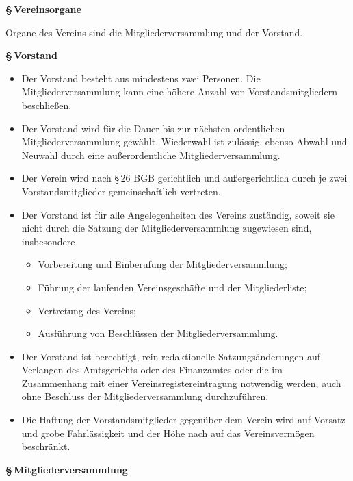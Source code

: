 \documentclass[11pt]{article}
\def\items#1{{%
  \itcounter0%
  \begin{itemize}
  #1
  \end{itemize}
}}
\let\it\item%
\def\item{
  \advance\itcounter1%
  \it[(\the\itcounter)]
}
\def\paragraf#1{
  \advance\itcounter1%
  \par\medskip
  {\large\bfseries \S\,\the\itcounter\quad#1}
  \par\smallskip
}
\begin{document}
\paragraf{Vereinsorgane}
\medskip

Organe des Vereins sind die Mitgliederversammlung und der Vorstand.
\bigskip

\paragraf{Vorstand}

\items{
   \item
     Der Vorstand besteht aus mindestens zwei Personen.
     Die Mitgliederversammlung kann eine h{\"o}here Anzahl von Vorstandsmitgliedern beschlie{\ss}en.
   \item
     Der Vorstand wird f\"ur die Dauer bis zur n\"achsten ordentlichen Mitgliederversammlung
     gew{\"a}hlt. Wiederwahl ist zul{\"a}ssig, ebenso Abwahl und Neuwahl durch eine au{\ss}erordentliche
     Mitgliederversammlung.
   \item
     Der Verein wird nach \S\,26 BGB gerichtlich und au{\ss}ergerichtlich durch je zwei
     Vorstandsmitglieder gemeinschaftlich vertreten.
   \item
     Der Vorstand ist f{\"u}r alle Angelegenheiten des Vereins zust{\"a}ndig, soweit sie nicht
     durch die Satzung der Mitgliederversammlung zugewiesen sind, insbesondere
     \items{
       \item Vorbereitung und Einberufung der Mitgliederversammlung;
       \item F{\"u}hrung der laufenden Vereinsgesch{\"a}fte und der Mitgliederliste;
       \item Vertretung des Vereins;
       \item Ausf{\"u}hrung von Beschl{\"u}ssen der Mitgliederversammlung.
     }
   \item
     Der Vorstand ist berechtigt, rein redaktionelle Satzungs{\"a}nderungen auf Verlangen
     des Amtsgerichts oder des Finanzamtes oder die im Zusammenhang mit einer Vereinsregistereintragung
     notwendig werden, auch ohne Beschluss der Mitgliederversammlung durchzuf{\"u}hren.
   \item
     Die Haftung der Vorstandsmitglieder gegen{\"u}ber dem Verein wird auf Vorsatz und grobe
     Fahrl{\"a}ssigkeit und der H\"ohe nach auf das Vereinsverm\"ogen beschr{\"a}nkt.
}

\paragraf{Mitgliederversammlung}
\end{document}
